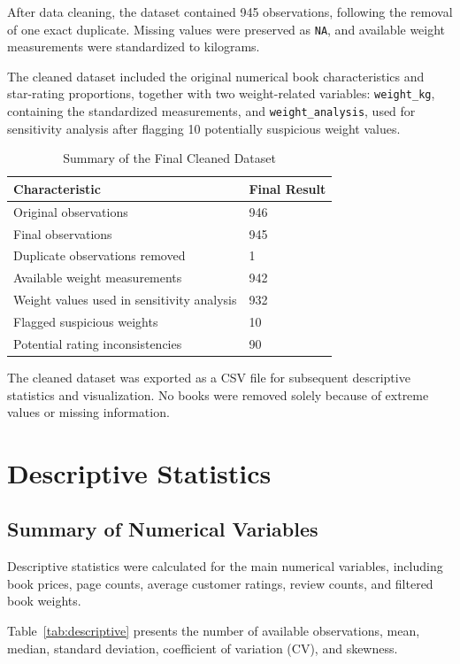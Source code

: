 \documentclass[11pt,a4paper]{article}
\begin{document}
After data cleaning, the dataset contained 945 observations,
following the removal of one exact duplicate. Missing values
were preserved as \texttt{NA}, and available weight measurements
were standardized to kilograms.

The cleaned dataset included the original numerical book
characteristics and star-rating proportions, together with
two weight-related variables: \texttt{weight\_kg}, containing
the standardized measurements, and \texttt{weight\_analysis},
used for sensitivity analysis after flagging 10 potentially
suspicious weight values.

\begin{table}[H]
\centering
\begin{tabular}{ll}
\toprule
Characteristic & Final Result \\
\midrule
Original observations & 946 \\
Final observations & 945 \\
Duplicate observations removed & 1 \\
Available weight measurements & 942 \\
Weight values used in sensitivity analysis & 932 \\
Flagged suspicious weights & 10 \\
Potential rating inconsistencies & 90 \\
\bottomrule
\end{tabular}
\caption{Summary of the Final Cleaned Dataset}
\label{tab:cleaned}
\end{table}
The cleaned dataset was exported as a CSV file for
subsequent descriptive statistics and visualization.
No books were removed solely because of extreme values
or missing information.
\newpage
\section{Descriptive Statistics}

\subsection{Summary of Numerical Variables}

Descriptive statistics were calculated for the main numerical
variables, including book prices, page counts, average customer
ratings, review counts, and filtered book weights.

Table~\ref{tab:descriptive} presents the number of available
observations, mean, median, standard deviation, coefficient
of variation (CV), and skewness.
\end{document}
